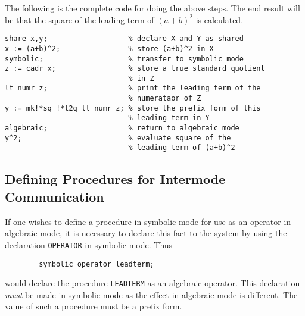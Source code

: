 The following is the complete code for doing the above steps. The end
result will be that the square of the leading term of $(a+b)^{2}$ is
calculated.

\begin{verbatim}
share x,y;                   % declare X and Y as shared
x := (a+b)^2;                % store (a+b)^2 in X
symbolic;                    % transfer to symbolic mode
z := cadr x;                 % store a true standard quotient
                             % in Z
lt numr z;                   % print the leading term of the
                             % numerataor of Z
y := mk!*sq !*t2q lt numr z; % store the prefix form of this
                             % leading term in Y
algebraic;                   % return to algebraic mode
y^2;                         % evaluate square of the
                             % leading term of (a+b)^2
\end{verbatim}

\subsection{Defining Procedures for Intermode Communication}

If one wishes to define a procedure in symbolic mode for use as an
operator in algebraic mode, it is necessary to declare this fact to the
system by using the declaration {\tt OPERATOR} in
symbolic mode. Thus
\begin{verbatim}
        symbolic operator leadterm;
\end{verbatim}
would declare the procedure {\tt LEADTERM} as an algebraic operator. This
declaration {\em must\/} be made in symbolic mode as the effect in algebraic
mode is different.  The value of such a procedure must be a prefix form.

